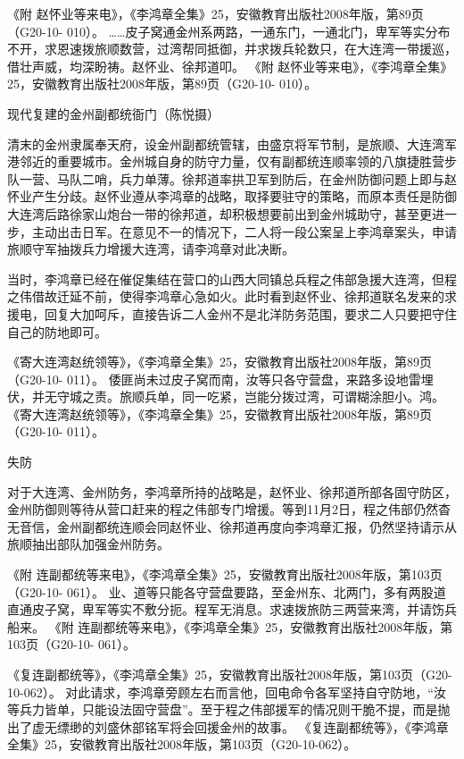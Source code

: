 \documentclass[12pt,UTF8]{ctexbook}
\begin{document}
《附 赵怀业等来电》，《李鸿章全集》25，安徽教育出版社2008年版，第89页（G20-10- 010）。
……皮子窝通金州系两路，一通东门，一通北门，卑军等实分布不开，求恩速拨旅顺数营，过湾帮同抵御，并求拨兵轮数只，在大连湾一带援巡，借壮声威，均深盼祷。赵怀业、徐邦道叩。 《附 赵怀业等来电》，《李鸿章全集》25，安徽教育出版社2008年版，第89页（G20-10- 010）。


现代复建的金州副都统衙门（陈悦摄）

清末的金州隶属奉天府，设金州副都统管辖，由盛京将军节制，是旅顺、大连湾军港邻近的重要城市。金州城自身的防守力量，仅有副都统连顺率领的八旗捷胜营步队一营、马队二哨，兵力单薄。徐邦道率拱卫军到防后，在金州防御问题上即与赵怀业产生分歧。赵怀业遵从李鸿章的战略，取择要驻守的策略，而原本责任是防御大连湾后路徐家山炮台一带的徐邦道，却积极想要前出到金州城助守，甚至更进一步，主动出击日军。在意见不一的情况下，二人将一段公案呈上李鸿章案头，申请旅顺守军抽拨兵力增援大连湾，请李鸿章对此决断。

当时，李鸿章已经在催促集结在营口的山西大同镇总兵程之伟部急援大连湾，但程之伟借故迁延不前，使得李鸿章心急如火。此时看到赵怀业、徐邦道联名发来的求援电，回复大加呵斥，直接告诉二人金州不是北洋防务范围，要求二人只要把守住自己的防地即可。

《寄大连湾赵统领等》，《李鸿章全集》25，安徽教育出版社2008年版，第89页（G20-10- 011）。
倭匪尚未过皮子窝而南，汝等只各守营盘，来路多设地雷埋伏，并无守城之责。旅顺兵单，同一吃紧，岂能分拨过湾，可谓糊涂胆小。鸿。 《寄大连湾赵统领等》，《李鸿章全集》25，安徽教育出版社2008年版，第89页（G20-10- 011）。

失防

对于大连湾、金州防务，李鸿章所持的战略是，赵怀业、徐邦道所部各固守防区，金州防御则等待从营口赶来的程之伟部专门增援。等到11月2日，程之伟部仍然杳无音信，金州副都统连顺会同赵怀业、徐邦道再度向李鸿章汇报，仍然坚持请示从旅顺抽出部队加强金州防务。

《附 连副都统等来电》，《李鸿章全集》25，安徽教育出版社2008年版，第103页（G20-10- 061）。
业、道等只能各守营盘要路，至金州东、北两门，多有两股道直通皮子窝，卑军等实不敷分扼。程军无消息。求速拨旅防三两营来湾，并请饬兵船来。 《附 连副都统等来电》，《李鸿章全集》25，安徽教育出版社2008年版，第103页（G20-10- 061）。

《复连副都统等》，《李鸿章全集》25，安徽教育出版社2008年版，第103页（G20-10-062）。
对此请求，李鸿章旁顾左右而言他，回电命令各军坚持自守防地，“汝等兵力皆单，只能设法固守营盘”。至于程之伟部援军的情况则干脆不提，而是抛出了虚无缥缈的刘盛休部铭军将会回援金州的故事。 《复连副都统等》，《李鸿章全集》25，安徽教育出版社2008年版，第103页（G20-10-062）。
\end{document}
